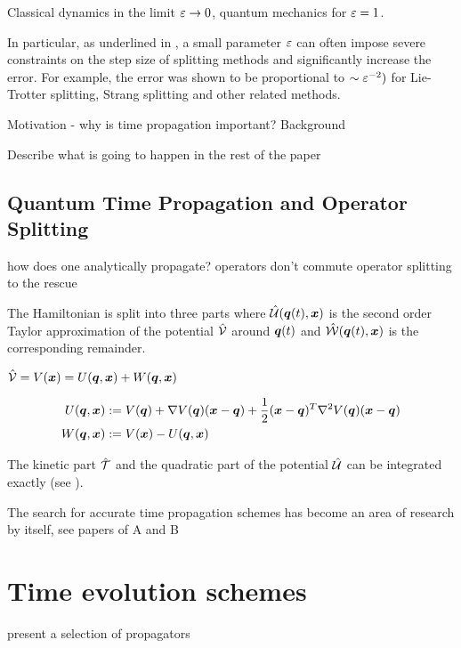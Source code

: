 Classical dynamics in the limit $\varepsilon \rightarrow 0$, quantum mechanics for $\varepsilon = 1$.

In particular, as underlined in \cite{GH_convsemiclassical}, a small parameter $\varepsilon$ can often impose severe constraints on the step size of splitting methods and significantly increase the error. For example, the error was shown to be proportional to $\sim \varepsilon^{-2})$ for Lie-Trotter splitting, Strang splitting and other related methods.

Motivation - why is time propagation important?
Background

Describe what is going to happen in the rest of the paper

\subsection{Quantum Time Propagation and Operator Splitting}


how does one analytically propagate?
operators don't commute
operator splitting to the rescue


The Hamiltonian is split into three parts
where $\hat{\mathcal{U}}(\bm{q}(t),\bm{x})$ is the second order Taylor approximation of the potential $\hat{\mathcal{V}}$ around $\bm{q}(t)$ and $\hat{\mathcal{W}}(\bm{q}(t),\bm{x})$ is the corresponding remainder.

$\hat{\mathcal{V}} = V(\bm{x}) = U(\bm{q},\bm{x}) + W(\bm{q},\bm{x})$

\begin{align}
	U(\bm{q},\bm{x}) &:= V(\bm{q}) + \nabla V(\bm{q}) (\bm{x}-\bm{q})
	+ \frac{1}{2} (\bm{x}-\bm{q})^T \nabla^2 V(\bm{q}) (\bm{x}-\bm{q}) \\
	W(\bm{q},\bm{x}) &:= V(\bm{x}) - U(\bm{q},\bm{x})
\end{align}

The kinetic part $\hat{\mathcal{T}}$ and the quadratic part of the potential $\hat{\mathcal{U}}$ can be integrated exactly (see \cite{FGL_semiclassical_dynamics}).


The search for accurate time propagation schemes has become an area of research by itself, see papers of A and B


\clearpage
\section{Time evolution schemes}

present a selection of propagators

